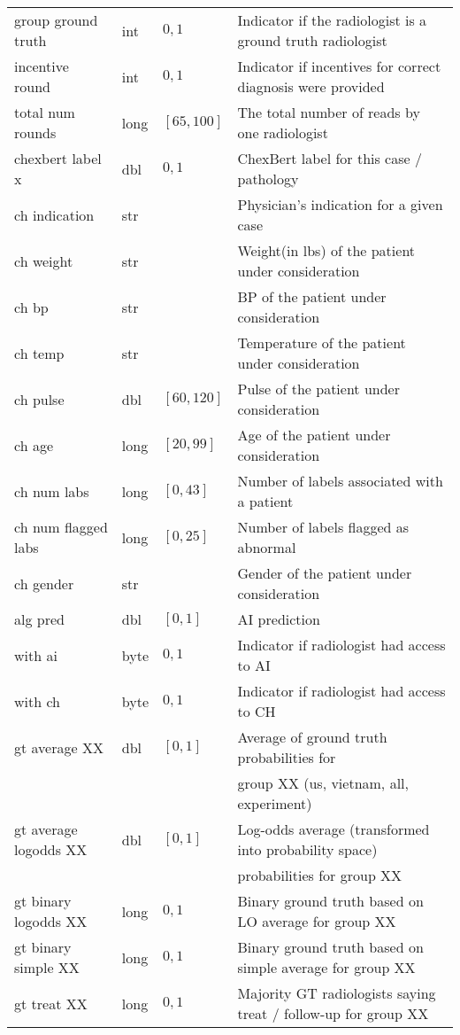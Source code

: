 {\begin{tabular}{|l|l|l|l|}
group ground truth & int & ${0,1}$ & Indicator if the radiologist is a ground truth radiologist \\
incentive round & int & ${0,1}$ & Indicator if incentives for correct diagnosis were provided \\
total num rounds & long & $[65,100]$ & The total number of reads by one radiologist  \\
chexbert label x & dbl & ${0,1}$ & ChexBert label for this case / pathology \\
ch indication & str & & Physician's indication for a given case \\
ch weight & str & & Weight(in lbs) of the patient under consideration \\
ch bp & str & & BP of the patient under consideration\\
ch temp & str & & Temperature of the patient under consideration \\
ch pulse & dbl & $[60,120]$ & Pulse of the patient under consideration \\
ch age & long & $[20,99]$ & Age of the patient under consideration \\
ch num labs & long & $[0,43]$ & Number of labels associated with a patient \\
ch num flagged labs & long & $[0,25]$ & Number of labels flagged as abnormal \\
ch gender & str & & Gender of the patient under consideration \\
alg pred & dbl & $[0,1]$ & AI prediction \\
with ai & byte & ${0,1}$ & Indicator if radiologist had access to AI \\
with ch & byte & ${0,1}$ & Indicator if radiologist had access to CH \\
gt average XX & dbl & $[0,1]$ & Average of ground truth probabilities for \\
 & & & group XX (us, vietnam, all, experiment) \\
gt average logodds XX & dbl & $[0,1]$ & Log-odds average (transformed into probability space) \\
 & & & probabilities for group XX \\
gt binary logodds XX & long & ${0,1}$ & Binary ground truth based on LO average for group XX \\
gt binary simple XX & long & ${0,1}$ & Binary ground truth based on simple average for group XX \\
gt treat XX & long & ${0,1}$ & Majority GT radiologists saying treat / follow-up for group XX \\

\end{tabular}}
